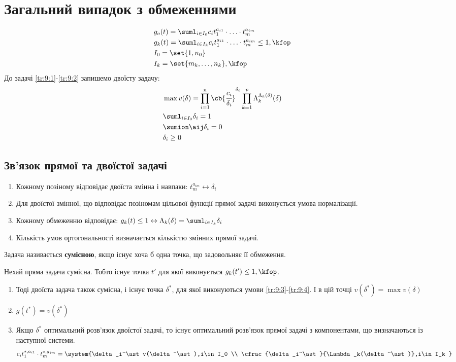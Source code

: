\section{Загальний випадок з обмеженнями}
\begin{eqnarray}
&g_o(t) = \suml_{i\in I_0} c_it_1^{a_{i1}}\cdot\ldots\cdot t_m^{a_{im}}\label{tr:9:1}\\
&g_k(t) = \suml_{i\in I_k} c_it_1^{a_{i1}}\cdot\ldots\cdot t_m^{a_{im}} \leq 1,\kfop\label{tr:9:2}\\
&I_0 = \set{1,n_0}\\
&I_k = \set{m_k,\ldots,n_k},\kfop
\end{eqnarray}
До задачі \eqref{tr:9:1}-\eqref{tr:9:2} запишемо двоїсту задачу:
\begin{eqnarray}
&\max v(\delta) = \prod\limits_{i=1}^n \cb{\cfrac{c_i}{\delta_i}}^{\delta_i} \prod_{k=1}^p \Lambda_k^{\Lambda_k(\delta)} (\delta)\\
&\suml_{i\in I_0} \delta_i = 1\label{tr:9:3}\\
&\sumion \aij \delta_i = 0\\
&\delta_i \geq 0\label{tr:9:4}
\end{eqnarray}
\subsection{Зв’язок прямої та двоїстої задачі}
\begin{enumerate}
\item Кожному позіному відповідає двоїста змінна і навпаки: $t_m^{a_{im}} \leftrightarrow \delta_i$
\item Для двоїстої змінної, що відповідає позіномам цільової функції прямої задачі виконується умова нормалізації.
\item Кожному обмеженню відповідає: $g_k(t) \leq 1 \leftrightarrow \Lambda_k(\delta) = \suml_{i\in I_k} \delta_i$
\item Кількість умов ортогональності визначається кількістю змінних прямої задачі.
\end{enumerate}
Задача називається \textbf{сумісною}, якщо існує хоча б одна точка, що задовольняє її обмеження.
\begin{teor}
Нехай пряма задача сумісна. Тобто існує точка $t'$ для якої виконується $g_k(t')\leq 1,\kfop$.
\begin{enumerate}
\item Тоді двоїста задача також сумісна, і існує точка $\delta^*$, для якої виконуються умови \eqref{tr:9:3}-\eqref{tr:9:4}. І в цій точці $v(\delta^\ast) = \max v(\delta)$
\item $g(t^\ast) = v(\delta^\ast)$
\item Якщо $\delta^\ast$ оптимальний розв’язок двоїстої задачі, то існує оптимальний розв’язок прямої задачі з компонентами, що визначаються із наступної системи.
\begin{equation}\label{tr:9:5}
c_it_1^{\ast,a_{i1}}\cdot t_m^{
\ast,a_{im}} = \system{\delta_i^\ast v(\delta^\ast),i\in I_0 \\
\cfrac{\delta_i^\ast}{\Lambda_k(\delta^\ast)},i\in I_k
}
\end{equation}
\end{enumerate}
\end{teor}
